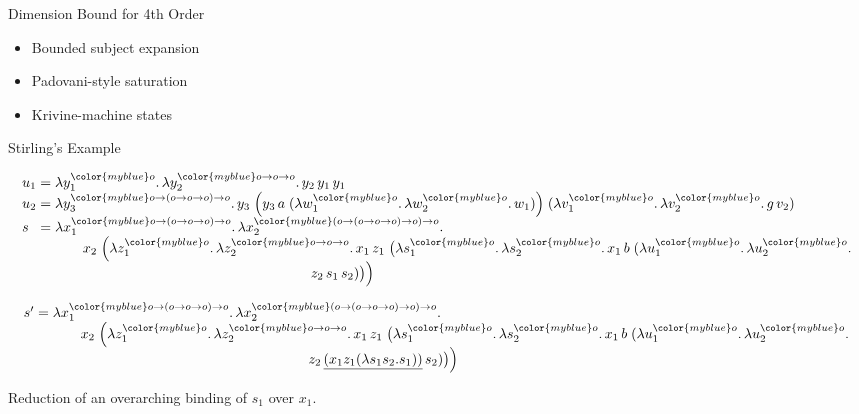 \documentclass{beamer}
\renewcommand{\:}{\mbox{\,:\,}\xspace}
\newcommand{\type}[1]{{\color{myblue}#1}}
\begin{document}

  
  \begin{frame}{Dimension Bound for 4th Order}
    \begin{itemize}
    \item Bounded subject expansion
    \item Padovani-style saturation
    \item Krivine-machine states
    \end{itemize}
  \end{frame}


  \begin{frame}{Stirling's Example}

    \begin{displaymath}
  \begin{array}{l@{\;}c@{\;}l}
    u_1 & = & \lambda y_1^{\type{o}}.\, \lambda y_2^{\type{o \to o \to o}}.\, y_2\, y_1\, y_1\\
    u_2 & = & \lambda y_3^{\type{o \to (o \to o \to o) \to o}}.\,
               y_3\;\Bigl(y_3\, a\; (\lambda w_1^{\type{o}}.\, \lambda w_2^{\type{o}}.\, w_1)\Bigr)
               \;(\lambda v_1^{\type{o}}.\, \lambda v_2^{\type{o}}.\, g\, v_2)\\
    s & = & \lambda x_1^{\type{o \to (o \to o \to o) \to o}}.\,
  \lambda x_2^{\type{(o \to (o \to o \to o) \to o) \to o}}.\,\\ & & \qquad
  x_2\;\Bigl(
    \lambda z_1^{\type{o}}.\, \lambda z_2^{\type{o \to o \to o}}.\,
    x_1\, z_1\;
    \bigl(
      \lambda s_1^{\type{o}}.\, \lambda s_2^{\type{o}}.\,
      x_1\, b\;
      (\lambda u_1^{\type{o}}.\, \lambda u_2^{\type{o}}.\,\\ & & \mbox{~}\hspace{18em}
      z_2\, s_1\, s_2)
    \bigr)
  \Bigr)\mbox{~}\hspace{5em}
  \end{array}
\end{displaymath}


\begin{displaymath}
  \begin{array}{l@{\;}c@{\;}l}
    s' & = & \lambda x_1^{\type{o \to (o \to o \to o) \to o}}.\,
             \lambda x_2^{\type{(o \to (o \to o \to o) \to o) \to o}}.\,\\ & & \qquad
  x_2\;\Bigl(
\lambda z_1^{\type{o}}.\, \lambda z_2^{\type{o \to o \to o}}.\,
    x_1\, z_1\;
    \bigl(
      \lambda s_1^{\type{o}}.\, \lambda s_2^{\type{o}}.\,
      x_1\, b\;
      (\lambda u_1^{\type{o}}.\, \lambda u_2^{\type{o}}.\,\\ & & \mbox{~}\hspace{18em}
      z_2\, \underline{(x_1z_1(\lambda s_1s_2.s_1))}\, s_2)
    \bigr)
  \Bigr)
  \end{array}
\end{displaymath}


   Reduction of an overarching binding of $s_1$ over $x_1$.
  \end{frame}
\end{document}
